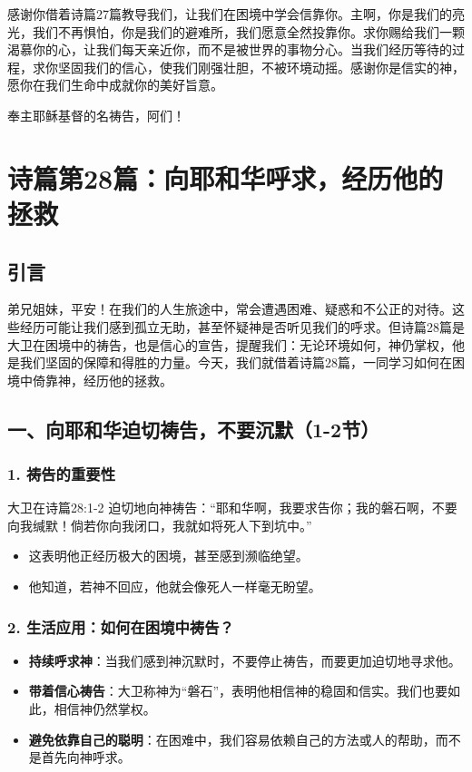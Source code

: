 \documentclass[a4paper, 12pt]{article}
\begin{document}
感谢你借着诗篇27篇教导我们，让我们在困境中学会信靠你。主啊，你是我们的亮光，我们不再惧怕，你是我们的避难所，我们愿意全然投靠你。求你赐给我们一颗渴慕你的心，让我们每天亲近你，而不是被世界的事物分心。当我们经历等待的过程，求你坚固我们的信心，使我们刚强壮胆，不被环境动摇。感谢你是信实的神，愿你在我们生命中成就你的美好旨意。

奉主耶稣基督的名祷告，阿们！
\newpage
\section{诗篇第28篇：向耶和华呼求，经历他的拯救}
\subsection*{引言}
\hspace{0.6cm}弟兄姐妹，平安！在我们的人生旅途中，常会遭遇困难、疑惑和不公正的对待。这些经历可能让我们感到孤立无助，甚至怀疑神是否听见我们的呼求。但诗篇28篇是大卫在困境中的祷告，也是信心的宣告，提醒我们：无论环境如何，神仍掌权，他是我们坚固的保障和得胜的力量。今天，我们就借着诗篇28篇，一同学习如何在困境中倚靠神，经历他的拯救。

\subsection*{一、向耶和华迫切祷告，不要沉默（1-2节）}
\subsubsection*{1. 祷告的重要性}
\hspace{0.6cm}大卫在诗篇28:1-2 迫切地向神祷告：“耶和华啊，我要求告你；我的磐石啊，不要向我缄默！倘若你向我闭口，我就如将死人下到坑中。”
\begin{itemize}
    \item 这表明他正经历极大的困境，甚至感到濒临绝望。
    \item 他知道，若神不回应，他就会像死人一样毫无盼望。
\end{itemize}


\subsubsection*{2. 生活应用：如何在困境中祷告？}

\begin{itemize}
    \item \textbf{持续呼求神}：当我们感到神沉默时，不要停止祷告，而要更加迫切地寻求他。

    \item \textbf{带着信心祷告}：大卫称神为“磐石”，表明他相信神的稳固和信实。我们也要如此，相信神仍然掌权。

    \item \textbf{避免依靠自己的聪明}：在困难中，我们容易依赖自己的方法或人的帮助，而不是首先向神呼求。

\end{itemize}
\end{document}
